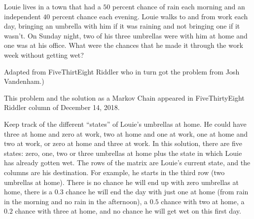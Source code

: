 \documentclass[12pt]{article}
\begin{document}
\begin{exercise}
    Louie lives in a town that had a \( 50 \) percent chance of rain
    each morning and an independent \( 40 \) percent chance each
    evening.  Louie walks to and from work each day, bringing an
    umbrella with him if it was raining and not bringing one if it
    wasn't.  On Sunday night, two of his three umbrellas were with him
    at home and one was at his office.  What were the chances that he
    made it through the work week without getting wet?
\end{exercise}
\begin{solution}
    Adapted from 
    {FiveThirtEight Riddler} who in turn got the problem from Josh
    Vandenham.)
    \begin{remark}
        This problem and the solution as a Markov Chain appeared in
        {FiveThirtyEight Riddler column of December 14, 2018.}
    \end{remark}

    Keep track of the different ``states'' of Louie's umbrellas at home.
    He could have three at home and zero at work, two at home and one at
    work, one at home and two at work, or zero at home and three at
    work.  In this solution, there are five states:  zero, one, two or
    three umbrellas at home plus the state in which Louie has already
    gotten wet.  The rows of the matrix are Louie's current state, and
    the columns are his destination.  For example, he starts in the
    third row (two umbrellas at home).  There is no chance he will end
    up with zero umbrellas at home, there is a \( 0.3 \) chance he will
    end the day with just one at home (from rain in the morning and no
    rain in the afternoon), a \( 0.5 \) chance with two at home, a \(
    0.2 \) chance with three at home, and no chance he will get wet on
    this first day.


\end{solution}
\end{document}
